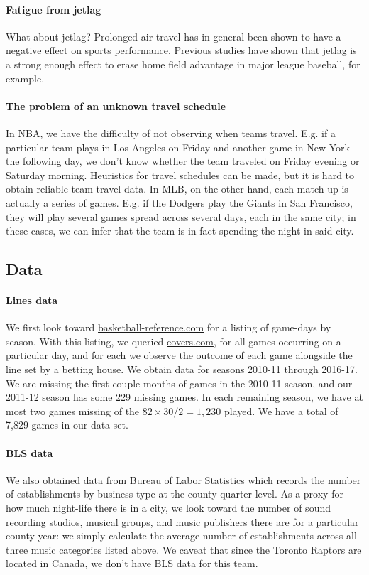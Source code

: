 \documentclass[letterpaper,12pt]{article}
\begin{document}
\paragraph{Fatigue from jetlag}
What about jetlag? Prolonged air travel has in general been shown
to have a negative effect on sports performance.\cite{leeandgalvez}
Previous studies have shown that jetlag is a strong enough effect
to erase home field advantage in major league baseball, for example.\cite{songetal}

\paragraph{The problem of an unknown travel schedule} In NBA, we have the difficulty of not observing when teams travel. E.g. if a particular team  plays
in Los Angeles on Friday and another game in New York the following day, we don't
know whether the team traveled on Friday evening or Saturday morning. Heuristics for
travel schedules can be made, but it is hard to obtain reliable team-travel data.
In MLB, on the other hand, each match-up is actually a series of games. E.g.
if the Dodgers play the Giants in San Francisco, they will play several games spread
across several days, each in the same city; in these cases, we can infer that the team
is in fact spending the night in said city.


\subsection{Data}
\paragraph{Lines data} We first look toward 
\href{http://www.basketball-reference.com/leagues/}{basketball-reference.com}
for a listing of game-days by season. With this listing, we queried \href{http://www.covers.com/sports/NBA/matchups?selectedDate=2011-1-01}{covers.com},
for all games occurring on a particular day, and for each we observe the
outcome of each game alongside the line set by a betting house.\cite{hrisports} We obtain
data for seasons 2010-11 through 2016-17. We are missing the first couple months of games 
in the 2010-11 season, and our 2011-12 season has some 229 missing games. In each remaining
season, we have at most two games missing of the $82 \times 30 / 2 = 1,230$ played.
We have a total of 7,829 games in our data-set.


\paragraph{BLS data} We also obtained data from
\href{https://www.bls.gov/data/}{Bureau of Labor Statistics} which records the number of establishments by business type at the county-quarter level. As a 
proxy for how much night-life there is in a city, we look toward the 
number of sound recording studios, musical groups, and music publishers there 
are for a particular county-year: we simply calculate the average number of establishments across all three music categories listed above. We caveat that since the Toronto Raptors are located in Canada, we don't have BLS data for this team.
\end{document}
